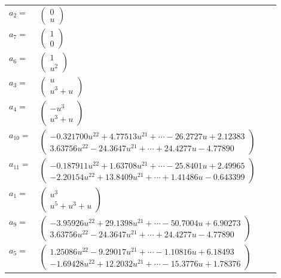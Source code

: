 \documentclass[1p]{elsarticle_modified}
\theoremstyle{definition}
\begin{document}
\begin{tabular}{m{7pt} m{180pt} m{7pt} m{180pt} }
\flushright $a_{2}=$&$\begin{pmatrix}0\\u\end{pmatrix}$ \\
\flushright $a_{7}=$&$\begin{pmatrix}1\\0\end{pmatrix}$ \\
\flushright $a_{6}=$&$\begin{pmatrix}1\\u^2\end{pmatrix}$ \\
\flushright $a_{3}=$&$\begin{pmatrix}u\\u^3+u\end{pmatrix}$ \\
\flushright $a_{4}=$&$\begin{pmatrix}- u^3\\u^3+u\end{pmatrix}$ \\
\flushright $a_{10}=$&$\begin{pmatrix}-0.321700 u^{22}+4.77513 u^{21}+\cdots-26.2727 u+2.12383\\3.63756 u^{22}-24.3647 u^{21}+\cdots+24.4277 u-4.77890\end{pmatrix}$ \\
\flushright $a_{11}=$&$\begin{pmatrix}-0.187911 u^{22}+1.63708 u^{21}+\cdots-25.8401 u+2.49965\\-2.20154 u^{22}+13.8409 u^{21}+\cdots+1.41486 u-0.643399\end{pmatrix}$ \\
\flushright $a_{1}=$&$\begin{pmatrix}u^3\\u^5+u^3+u\end{pmatrix}$ \\
\flushright $a_{9}=$&$\begin{pmatrix}-3.95926 u^{22}+29.1398 u^{21}+\cdots-50.7004 u+6.90273\\3.63756 u^{22}-24.3647 u^{21}+\cdots+24.4277 u-4.77890\end{pmatrix}$ \\
\flushright $a_{5}=$&$\begin{pmatrix}1.25086 u^{22}-9.29017 u^{21}+\cdots-1.10816 u+6.18493\\-1.69428 u^{22}+12.2032 u^{21}+\cdots-15.3776 u+1.78376\end{pmatrix}$ \\

\end{tabular}
\end{document}
